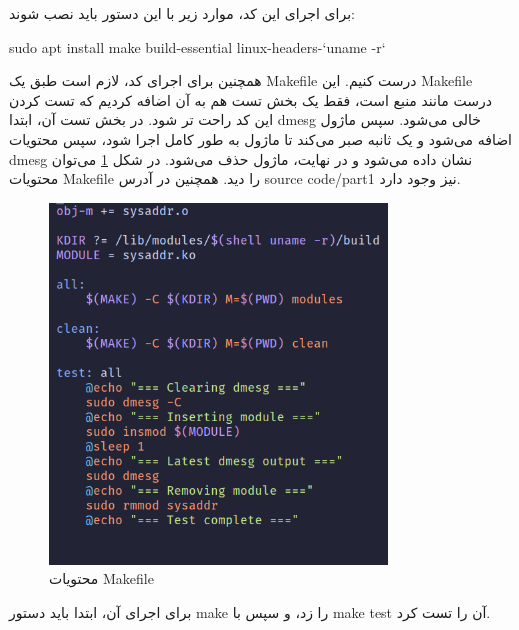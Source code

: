 \documentclass[12pt]{article}
\begin{document}
        برای اجرای این کد، موارد زیر با این دستور باید نصب شوند:

        \begin{english}
            sudo apt install make build-essential linux-headers-`uname -r`
        \end{english}

        همچنین برای اجرای کد، لازم است طبق
        \cite{sourcerer-kernel-module}
        یک 
        \textenglish{Makefile}
        درست کنیم. این 
        \textenglish{Makefile}
        درست مانند منبع است، فقط یک بخش تست هم به آن اضافه کردیم که تست کردن این کد راحت تر شود. در بخش تست آن، ابتدا 
        \textenglish{dmesg}
        خالی می‌شود. سپس ماژول اضافه می‌شود و یک ثانبه صبر می‌کند تا ماژول به طور کامل اجرا شود، سپس محتویات 
        \textenglish{dmesg}
        نشان داده می‌شود و در نهایت، ماژول حذف می‌شود. در شکل 
        \ref{im10}
        می‌توان محتویات
        \textenglish{Makefile}
        را دید. همچنین در آدرس
        \textenglish{source code/part1}
        نیز وجود دارد.

        \begin{figure}[H]
		\centering
		\includegraphics[width=0.8\textwidth]{report8-resources/10.png}
		\caption{محتویات \textenglish{Makefile}}
            \label{im10}
	\end{figure}

        برای اجرای آن، ابتدا باید دستور
        \textenglish{make}
        را زد، و سپس با
        \textenglish{make test}
        آن را تست کرد.
\end{document}
